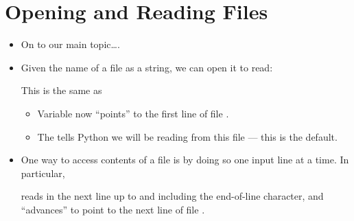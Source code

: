 \documentclass[letterpaper,10pt,english]{sphinxmanual}
\begin{document}
\section{Opening and Reading Files}
\label{\detokenize{lecture_notes/lec13_files_web:opening-and-reading-files}}\begin{itemize}
\item {} 
On to our main topic….

\item {} 
Given the name of a file as a string, we can open it to read:

%
\begin{sphinxVerbatim}[commandchars=\\\{\}]
  
\end{sphinxVerbatim}

This is the same as

%
\begin{sphinxVerbatim}[commandchars=\\\{\}]
  
\end{sphinxVerbatim}
\begin{itemize}
\item {} 
Variable  now “points” to the first line of file .

\item {} 
The  tells Python we will be reading from this file — this
is the default.

\end{itemize}

\item {} 
One way to access contents of a file is by doing so one input line
at a time.  In particular,

%
\begin{sphinxVerbatim}[commandchars=\\\{\}]
  
\end{sphinxVerbatim}

reads in the next line up to and including the end-of-line character,
and “advances”  to point to the next line of file .


\end{itemize}
\end{document}
